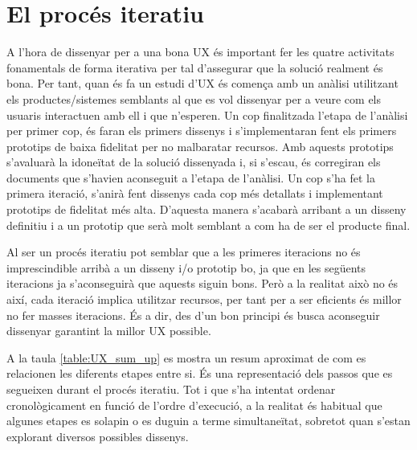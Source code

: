 \section{El procés iteratiu}
A l'hora de dissenyar per a una bona \ac{UX} és important fer les quatre activitats fonamentals de forma iterativa per tal d'assegurar que la solució realment és bona. Per tant, quan és fa un estudi d'\ac{UX} és comença amb un anàlisi utilitzant els productes/sistemes semblants al que es vol dissenyar per a veure com els usuaris interactuen amb ell i que n'esperen. Un cop finalitzada l'etapa de l'anàlisi per primer cop, és faran els primers dissenys i s'implementaran fent els primers prototips de baixa fidelitat per no malbaratar recursos. Amb aquests prototips s'avaluarà la idoneïtat de la solució dissenyada i, si s'escau, és corregiran els documents que s'havien aconseguit a l'etapa de l'anàlisi. Un cop s'ha fet la primera iteració, s'anirà fent dissenys cada cop més detallats i implementant prototips de fidelitat més alta. D'aquesta manera s'acabarà arribant a un disseny definitiu i a un prototip que serà molt semblant a com ha de ser el producte final.

Al ser un procés iteratiu pot semblar que a les primeres iteracions no és imprescindible arribà a un disseny i/o prototip bo, ja que en les següents iteracions ja s'aconseguirà que aquests siguin bons. Però a la realitat això no és així, cada iteració implica utilitzar recursos, per tant per a ser eficients és millor no fer masses iteracions. És a dir, des d'un bon principi és busca aconseguir dissenyar garantint la millor \ac{UX} possible.

A la taula \ref{table:UX_sum_up} es mostra un resum aproximat de com es relacionen les diferents etapes entre si. És una representació dels passos que es segueixen durant el procés iteratiu. Tot i que s'ha intentat ordenar cronològicament en funció de l'ordre d'execució, a la realitat és habitual que algunes etapes es solapin o es duguin a terme simultaneïtat, sobretot quan s'estan explorant diversos possibles dissenys.

